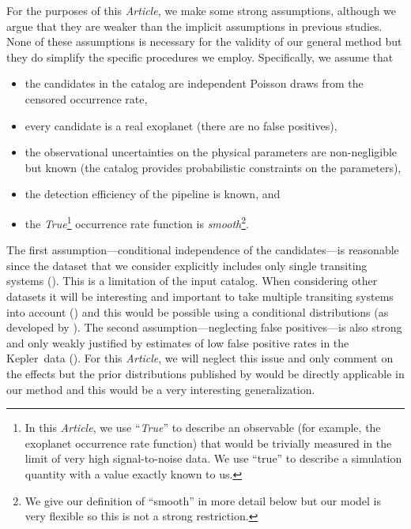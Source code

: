 \documentclass[12pt,preprint]{aastex}
\newcommand{\project}[1]{{\sffamily #1}}
\newcommand{\kepler}{\project{Kepler}}
\newcommand{\paper}{\textsl{Article}}
\newcommand{\foreign}[1]{\emph{#1}}
\newcommand{\True}{\foreign{True}}
\begin{document}
For the purposes of this \paper, we make some strong assumptions, although we
argue that they are weaker than the implicit assumptions in previous
studies.
None of these assumptions is necessary for the validity of our general method
but they do simplify the specific procedures we employ.
Specifically, we assume that
\begin{itemize}

\item the candidates in the catalog are independent Poisson draws from the
censored occurrence rate,

\item every candidate is a real exoplanet (there are no false positives),

\item the observational uncertainties on the physical parameters are
non-negligible but known (the catalog provides probabilistic constraints on
the parameters),

\item the detection efficiency of the pipeline is known, and

\item the \True\footnote{In this \paper, we use ``\True'' to describe an
observable (for example, the exoplanet occurrence rate function) that would be
trivially measured in the limit of very high signal-to-noise data.
We use ``true'' to describe a simulation quantity with a value exactly known
to us.} occurrence rate function is \emph{smooth}\footnote{We give our
definition of ``smooth'' in more detail below but our model is very flexible
so this is not a strong restriction.}.

\end{itemize}
The first assumption---conditional independence of the candidates---is
reasonable since the dataset that we consider explicitly includes only single
transiting systems (\citealt{petigura}).
This is a limitation of the input catalog.
When considering other datasets it will be interesting and important to take
multiple transiting systems into account (\citealt{lissauer, tremaine, fang})
and this would be possible using a conditional distributions (as developed by
\citealt{tremaine}).
The second assumption---neglecting false positives---is also strong and only
weakly justified by estimates of low false positive rates in the \kepler\ data
(\citealt{fressin-fp, morton}).
For this \paper, we will neglect this issue and only comment on the effects
but the prior distributions published by \citet{fressin-fp} would be directly
applicable in our method and this would be a very interesting generalization.
\end{document}
